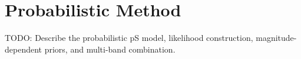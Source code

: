 \section{Probabilistic Method}

TODO: Describe the probabilistic pS model, likelihood construction, magnitude-dependent priors, and multi-band combination.
